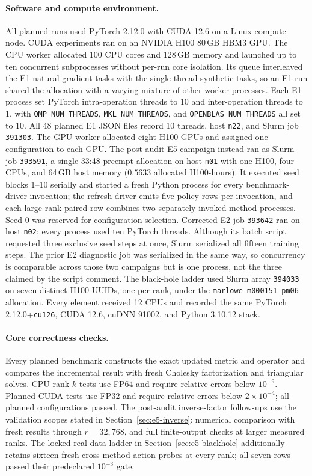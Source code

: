\documentclass[11pt]{article}
\begin{document}
\paragraph{Software and compute environment.}
All planned runs used PyTorch 2.12.0 with CUDA 12.6 on a Linux compute node.
CUDA experiments ran on an NVIDIA H100 80\,GB HBM3 GPU.  The CPU worker
allocated 100 CPU cores and 128\,GB memory and launched up to ten concurrent
subprocesses without per-run core isolation.  Its queue interleaved the E1
natural-gradient tasks with the single-thread synthetic tasks, so an E1 run
shared the allocation with a varying mixture of other worker processes.  Each
E1 process set PyTorch intra-operation threads to 10 and inter-operation
threads to 1, with \texttt{OMP\_NUM\_THREADS},
\texttt{MKL\_NUM\_THREADS}, and \texttt{OPENBLAS\_NUM\_THREADS} all set to 10.
All 48 planned E1 JSON files record 10 threads, host \texttt{n22}, and Slurm
job \texttt{391303}.  The GPU worker allocated eight H100 GPUs and assigned
one configuration to each GPU.  The post-audit E5 campaign instead ran as
Slurm job \texttt{393591}, a single 33:48 preempt allocation on host
\texttt{n01} with one H100, four CPUs, and 64\,GB host memory
(\(0.5633\) allocated H100-hours).  It executed seed blocks 1--10 serially and
started a fresh Python process for every benchmark-driver invocation; the
refresh driver emits five policy rows per invocation, and each large-rank
paired row combines two separately invoked method processes.  Seed 0 was
reserved for configuration selection.  Corrected E2 job \texttt{393642} ran
on host \texttt{n02}; every process used ten PyTorch threads.  Although its
batch script requested three exclusive seed steps at once, Slurm serialized
all fifteen training steps.  The prior E2 diagnostic job was serialized in
the same way, so concurrency is comparable across those two campaigns but is
one process, not the three claimed by the script comment.
The black-hole ladder used Slurm array \texttt{394033} on seven distinct H100
UUIDs, one per rank, under the \texttt{marlowe-m000151-pm06} allocation.
Every element received 12 CPUs and recorded the same PyTorch
2.12.0+\texttt{cu126}, CUDA 12.6, cuDNN 91002, and Python 3.10.12 stack.

\paragraph{Core correctness checks.}
Every planned benchmark constructs the exact updated metric and operator and
compares the incremental result with fresh Cholesky factorization and
triangular solves.  CPU rank-\(k\) tests use FP64 and require relative errors
below \(10^{-9}\).  Planned CUDA tests use FP32 and require relative errors
below \(2\times10^{-4}\); all planned configurations passed.  The post-audit
inverse-factor follow-ups use the validation scopes stated in
Section~\ref{sec:e5-inverse}: numerical comparison with fresh results through
\(r=32{,}768\), and full finite-output checks at larger measured ranks.
The locked real-data ladder in Section~\ref{sec:e5-blackhole} additionally
retains sixteen fresh cross-method action probes at every rank; all seven rows
passed their predeclared \(10^{-3}\) gate.
\end{document}
